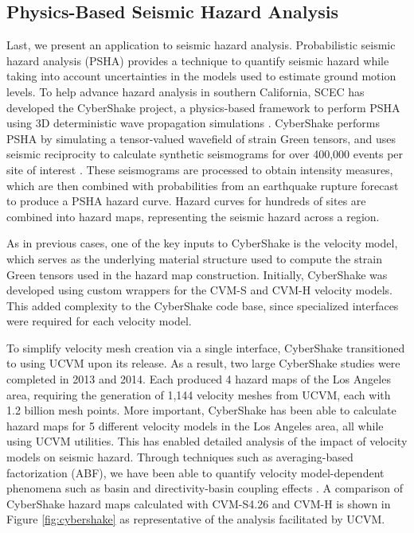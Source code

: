 
\subsection{Physics-Based Seismic Hazard Analysis}

Last, we present an application to seismic hazard analysis. Probabilistic seismic hazard analysis (PSHA) provides a technique to quantify seismic hazard while taking into account uncertainties in the models used to estimate ground motion levels. To help advance hazard analysis in southern California, SCEC has developed the CyberShake project, a physics-based framework to perform PSHA using 3D deterministic wave propagation simulations \citep{Graves_2011_PAG}.  CyberShake performs PSHA by simulating a tensor-valued wavefield of strain Green tensors, and uses seismic reciprocity to calculate synthetic seismograms for over 400,000 events per site of interest \citep{Zhao_2006_BSSA}. These seismograms are processed to obtain intensity measures, which are then combined with probabilities from an earthquake rupture forecast to produce a PSHA hazard curve. Hazard curves for hundreds of sites are combined into hazard maps, representing the seismic hazard across a region.

As in previous cases, one of the key inputs to CyberShake is the velocity model, which serves as the underlying material structure used to compute the strain Green tensors used in the hazard map construction. Initially, CyberShake was developed using custom wrappers for the CVM-S and CVM-H velocity models. This added complexity to the CyberShake code base, since specialized interfaces were required for each velocity model.

To simplify velocity mesh creation via a single interface, CyberShake transitioned to using UCVM upon its release. As a result, two large CyberShake studies were completed in 2013 \citep{Callaghan_2013_Proc} and 2014.  Each produced 4 hazard maps of the Los Angeles area, requiring the generation of 1,144 velocity meshes from UCVM, each with 1.2 billion mesh points. More important, CyberShake has been able to calculate hazard maps for 5 different velocity models in the Los Angeles area, all while using UCVM utilities. This has enabled detailed analysis of the impact of velocity models on seismic hazard. Through techniques such as averaging-based factorization (ABF), we have been able to quantify velocity model-dependent phenomena such as basin and directivity-basin coupling effects \citep{Wang_2014_BSSA}. A comparison of CyberShake hazard maps calculated with CVM-S4.26 and CVM-H is shown in Figure \ref{fig:cybershake} as representative of the analysis facilitated by UCVM.



